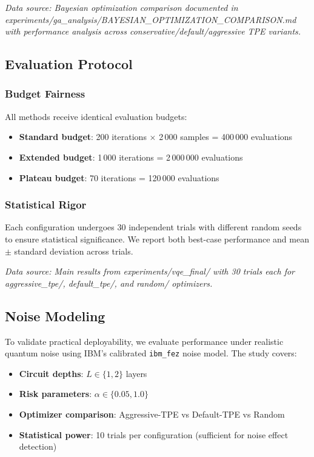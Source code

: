 \textit{Data source: Bayesian optimization comparison documented in experiments/ga\_analysis/BAYESIAN\_OPTIMIZATION\_COMPARISON.md with performance analysis across conservative/default/aggressive TPE variants.}

\subsection{Evaluation Protocol}

\subsubsection{Budget Fairness}
All methods receive identical evaluation budgets:
\begin{itemize}[nosep]
    \item \textbf{Standard budget}: 200 iterations $\times$ 2\,000 samples = 400\,000 evaluations
    \item \textbf{Extended budget}: 1\,000 iterations = 2\,000\,000 evaluations  
    \item \textbf{Plateau budget}: 70 iterations = 120\,000 evaluations
\end{itemize}

\subsubsection{Statistical Rigor}
Each configuration undergoes 30 independent trials with different random seeds to ensure statistical significance.
We report both best-case performance and mean $\pm$ standard deviation across trials.

\textit{Data source: Main results from experiments/vqe\_final/ with 30 trials each for aggressive\_tpe/, default\_tpe/, and random/ optimizers.}

\subsection{Noise Modeling}

To validate practical deployability, we evaluate performance under realistic quantum noise using IBM's calibrated \texttt{ibm\_fez} noise model.
The study covers:
\begin{itemize}[nosep]
    \item \textbf{Circuit depths}: $L \in \{1, 2\}$ layers
    \item \textbf{Risk parameters}: $\alpha \in \{0.05, 1.0\}$  
    \item \textbf{Optimizer comparison}: Aggressive-TPE vs Default-TPE vs Random
    \item \textbf{Statistical power}: 10 trials per configuration (sufficient for noise effect detection)
\end{itemize}


